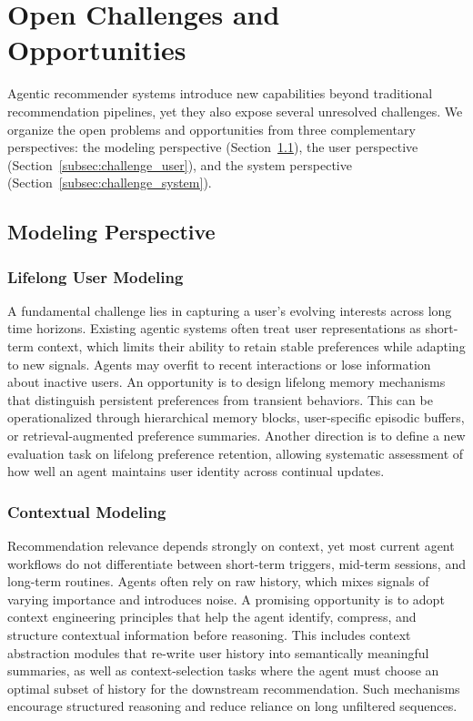 \section{Open Challenges and Opportunities}


Agentic recommender systems introduce new capabilities beyond traditional recommendation pipelines, yet they also expose several unresolved challenges. We organize the open problems and opportunities from three complementary perspectives: the modeling perspective (Section~\ref{subsec:challenge_modeling}), the user perspective (Section~\ref{subsec:challenge_user}), and the system perspective (Section~\ref{subsec:challenge_system}).

\subsection{Modeling Perspective}\label{subsec:challenge_modeling}

\subsubsection{Lifelong User Modeling}
A fundamental challenge lies in capturing a user's evolving interests across long time horizons. Existing agentic systems often treat user representations as short-term context, which limits their ability to retain stable preferences while adapting to new signals. Agents may overfit to recent interactions or lose information about inactive users.
An opportunity is to design lifelong memory mechanisms that distinguish persistent preferences from transient behaviors. This can be operationalized through hierarchical memory blocks, user-specific episodic buffers, or retrieval-augmented preference summaries. Another direction is to define a new evaluation task on lifelong preference retention, allowing systematic assessment of how well an agent maintains user identity across continual updates.

\subsubsection{Contextual Modeling}
Recommendation relevance depends strongly on context, yet most current agent workflows do not differentiate between short-term triggers, mid-term sessions, and long-term routines. Agents often rely on raw history, which mixes signals of varying importance and introduces noise.
A promising opportunity is to adopt context engineering principles that help the agent identify, compress, and structure contextual information before reasoning. This includes context abstraction modules that re-write user history into semantically meaningful summaries, as well as context-selection tasks where the agent must choose an optimal subset of history for the downstream recommendation. Such mechanisms encourage structured reasoning and reduce reliance on long unfiltered sequences.

